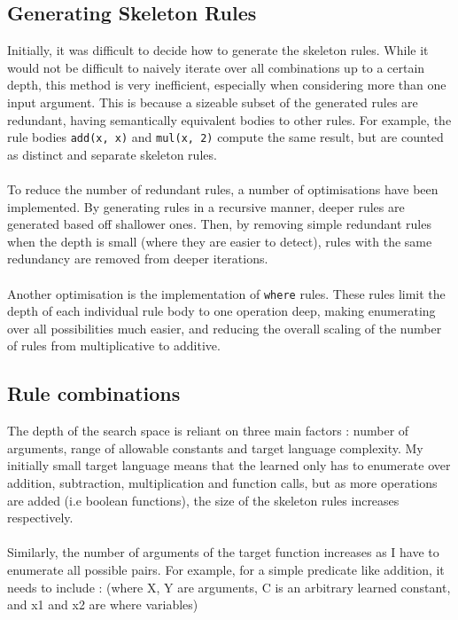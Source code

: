 \subsection{Generating Skeleton Rules}
Initially, it was difficult to decide how to generate the skeleton rules. While it would not be difficult to naively iterate over all combinations up to a certain depth, this method is very inefficient, especially when considering more than one input argument. This is because a sizeable subset of the generated rules are redundant, having semantically equivalent bodies to other rules. For example, the rule bodies \lstinline{add(x, x)} and \lstinline{mul(x, 2)} compute the same result, but are counted as distinct and separate skeleton rules.\\ \\
To reduce the number of redundant rules, a number of optimisations have been implemented. By generating rules in a recursive manner, deeper rules are generated based off shallower ones. Then, by removing simple redundant rules when the depth is small (where they are easier to detect), rules with the same redundancy are removed from deeper iterations. \\ \\
Another optimisation is the implementation of \lstinline{where} rules. These rules limit the depth of each individual rule body to one operation deep, making enumerating over all possibilities much easier, and reducing the overall scaling of the number of rules from multiplicative to additive. %

\subsection{Rule combinations}
The depth of the search space is reliant on three main factors : number of arguments, range of allowable constants and target language complexity. My initially small target language means that the learned only has to enumerate over addition, subtraction, multiplication and function calls, but as more operations are added (i.e boolean functions), the size of the skeleton rules increases respectively. \\ \\
Similarly, the number of arguments of the target function increases as I have to enumerate all possible pairs. For example, for a simple predicate like addition, it needs to include : (where X, Y are arguments, C is an arbitrary learned constant, and x1 and x2 are where variables) 


